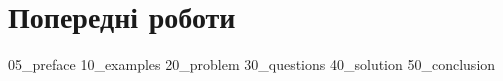 \chapter{Попередні роботи}
{05_preface}
{10_examples}
{20_problem}
{30_questions}
{40_solution}
{50_conclusion}
